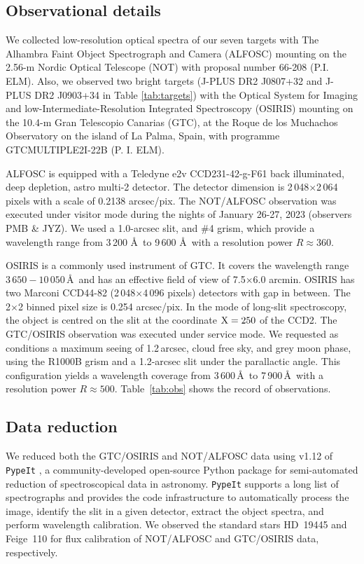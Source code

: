 \subsection{Observational details}
We collected low-resolution optical spectra of our seven targets with The Alhambra Faint Object Spectrograph and Camera (ALFOSC) mounting on the 2.56-m Nordic Optical Telescope (NOT) with proposal number 66-208 (P.I. ELM). Also, we observed two bright targets (J-PLUS DR2 J0807+32 and J-PLUS DR2 J0903+34 in Table \ref{tab:targets}) with the Optical System for Imaging and low-Intermediate-Resolution Integrated Spectroscopy (OSIRIS) mounting on the 10.4-m Gran Telescopio Canarias (GTC), at the Roque de los Muchachos Observatory on the island of La Palma, Spain, with programme GTCMULTIPLE2I-22B (P. I. ELM).

ALFOSC is equipped with a Teledyne e2v CCD231-42-g-F61 back illuminated, deep depletion, astro multi-2 detector. The detector dimension is 2\,048$\times$2\,064 pixels with a scale of 0.2138 arcsec/pix. The NOT/ALFOSC observation was executed under visitor mode during the nights of January 26-27, 2023 (observers PMB \& JYZ). We used a 1.0-arcsec slit, and \#4 grism, which provide a wavelength range from 3\,200 \AA\ to 9\,600 \AA\ with a resolution power $R\approx360$.

OSIRIS is a commonly used instrument of GTC. It covers the wavelength range $3\,650- 10\,050$\,\AA\ and has an effective field of view of 7.5$\times$6.0 arcmin. OSIRIS has two Marconi CCD44-82 (2\,048$\times$4\,096 pixels) detectors with gap in between. The 2$\times$2 binned pixel size is 0.254 arcsec/pix. In the mode of long-slit spectroscopy, the object is centred on the slit at the coordinate $\rm{X}
=250$ of the CCD2. The GTC/OSIRIS observation was executed under service mode. We requested as conditions a maximum seeing of 1.2\,arcsec, cloud free sky, and grey moon phase, using the R1000B grism and a 1.2-arcsec slit under the parallactic angle. This configuration yields a wavelength coverage from 3\,600\,\AA\ to 7\,900\,\AA\ with a resolution power $R\approx500$. Table~\ref{tab:obs} shows the record of observations.




\subsection{Data reduction}
We reduced both the GTC/OSIRIS and NOT/ALFOSC data using v1.12 of \texttt{PypeIt} \citep{pypeit:zenodo,pypeit:joss_pub}, a community-developed open-source Python package for semi-automated reduction of spectroscopical data in astronomy. \texttt{PypeIt} supports a long list of spectrographs and provides the code infrastructure to automatically process the image, identify the slit in a given detector, extract the object spectra, and perform wavelength calibration. We observed the standard stars HD~19445 and Feige~110 for flux calibration of NOT/ALFOSC and GTC/OSIRIS data, respectively.


